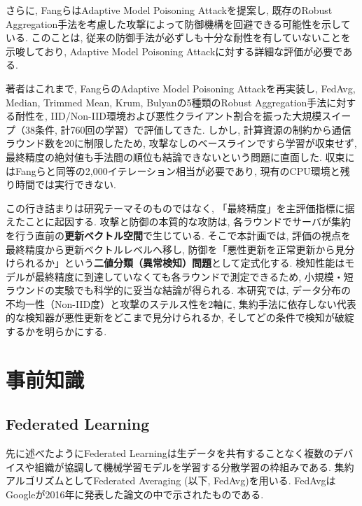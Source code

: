 \documentclass[a4j, twocolumn, dvipdfmx]{jsarticle}
\begin{document}
さらに, FangらはAdaptive Model Poisoning Attackを提案し, 既存のRobust Aggregation手法を考慮した攻撃によって防御機構を回避できる可能性を示している\cite{fang2020local}. このことは, 従来の防御手法が必ずしも十分な耐性を有していないことを示唆しており, Adaptive Model Poisoning Attackに対する詳細な評価が必要である.

著者はこれまで, Fangら\cite{fang2020local}のAdaptive Model Poisoning Attackを再実装し, FedAvg, Median, Trimmed Mean, Krum, Bulyanの5種類のRobust Aggregation手法に対する耐性を, IID/Non-IID環境および悪性クライアント割合を振った大規模スイープ（38条件, 計760回の学習）で評価してきた. しかし, 計算資源の制約から通信ラウンド数を20に制限したため, 攻撃なしのベースラインですら学習が収束せず, 最終精度の絶対値も手法間の順位も結論できないという問題に直面した. 収束にはFangらと同等の2{,}000イテレーション相当が必要であり, 現有のCPU環境と残り時間では実行できない.

この行き詰まりは研究テーマそのものではなく, 「最終精度」を主評価指標に据えたことに起因する. 攻撃と防御の本質的な攻防は, 各ラウンドでサーバが集約を行う直前の\textbf{更新ベクトル空間}で生じている. そこで本計画では, 評価の視点を最終精度から更新ベクトルレベルへ移し, 防御を「悪性更新を正常更新から見分けられるか」という\textbf{二値分類（異常検知）問題}として定式化する. 検知性能はモデルが最終精度に到達していなくても各ラウンドで測定できるため, 小規模・短ラウンドの実験でも科学的に妥当な結論が得られる. 本研究では, データ分布の不均一性（Non-IID度）と攻撃のステルス性を2軸に, 集約手法に依存しない代表的な検知器が悪性更新をどこまで見分けられるか, そしてどの条件で検知が破綻するかを明らかにする.

\section{事前知識}

\subsection{Federated Learning}
先に述べたようにFederated Learningは生データを共有することなく複数のデバイスや組織が協調して機械学習モデルを学習する分散学習の枠組みである\cite{mammen2021fl}.
集約アルゴリズムとしてFederated Averaging (以下, FedAvg)を用いる. FedAvgはGoogleが2016年に発表した論文の中で示されたものである\cite{mcmahan2017fedavg}.
\end{document}

